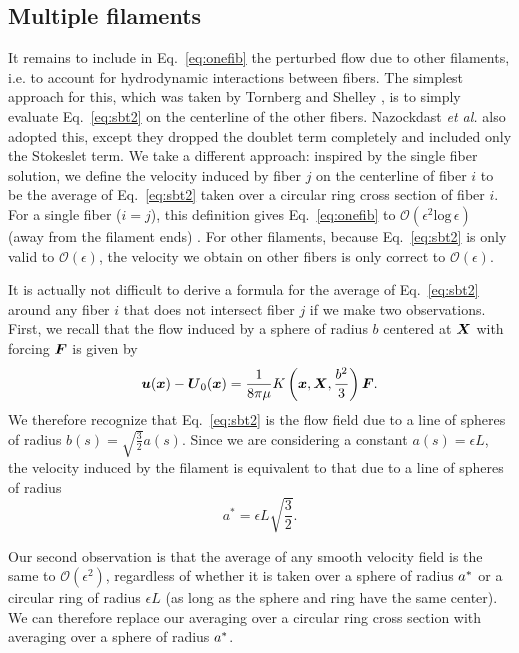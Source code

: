 \subsection{Multiple filaments}
It remains to include in Eq.\ \eqref{eq:onefib} the perturbed flow due to other filaments, i.e. to account for hydrodynamic interactions between fibers. The simplest approach for this, which was taken by Tornberg and Shelley \cite{ts04}, is to simply evaluate Eq.\ \eqref{eq:sbt2} on the centerline of the other fibers. Nazockdast \textit{et al.} also adopted this, except they dropped the doublet term completely and included only the Stokeslet term. We take a different approach: inspired by the single fiber solution, we define the velocity induced by fiber $j$ on the centerline of fiber $i$ to be the average of Eq.\ \eqref{eq:sbt2} taken over a circular ring cross section of fiber $i$. For a single fiber ($i=j$), this definition gives Eq.\ \eqref{eq:onefib} to $\mathcal{O}(\epsilon^2 \text{log}\, \epsilon)$ (away from the filament ends) \cite{johnson}. For other filaments, because Eq.\ \eqref{eq:sbt2} is only valid to $\mathcal{O}(\epsilon)$, the velocity we obtain on other fibers is only correct to $\mathcal{O}(\epsilon)$. 

It is actually not difficult to derive a formula for the average of Eq.\ \eqref{eq:sbt2} around any fiber $i$ that does not intersect fiber $j$ if we make two observations. First, we recall that the flow induced by a sphere of radius $b$ centered at $\boldsymbol{X}$ with forcing $\boldsymbol{F}$ is given by 
\begin{equation}
\label{eq:sphvel}
\boldsymbol{u}(\boldsymbol{x}) - \boldsymbol{U}_0(\boldsymbol{x}) = \frac{1}{8\pi\mu} K\left(\boldsymbol{x},\boldsymbol{X},\frac{b^2}{3}\right)\boldsymbol{F}. 
\end{equation}
We therefore recognize that Eq.\ \eqref{eq:sbt2} is the flow field due to a line of spheres of radius $\displaystyle{b(s) = \sqrt{\frac{3}{2}}a(s)}$. Since we are considering a constant $a(s)=\epsilon L$, the velocity induced by the filament is equivalent to that due to a line of spheres of radius 
\begin{equation}
\label{eq:rpyradius}
a^*=\epsilon L \sqrt{\frac{3}{2}}.
\end{equation}

Our second observation is that the average of any smooth velocity field is the same to $\mathcal{O}(\epsilon^2)$, regardless of whether it is taken over a sphere of radius $a^*$ or a circular ring of radius $\epsilon L$ (as long as the sphere and ring have the same center). We can therefore replace our averaging over a circular ring cross section with averaging over a sphere of radius $a^*$. 


